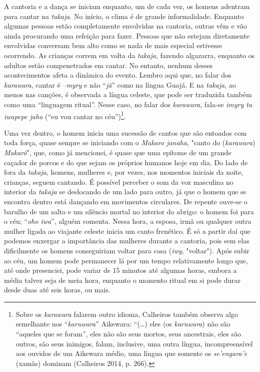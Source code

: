 A cantoria e a dança se iniciam enquanto, um de cada vez, os homens
adentram para cantar na \emph{takaja}. No início, o clima é de grande
informalidade. Enquanto algumas pessoas estão completamente envolvidas
na cantoria, outras vêm e vão ainda procurando uma refeição para fazer.
Pessoas que não estejam diretamente envolvidas conversam bem alto como
se nada de mais especial estivesse ocorrendo. As crianças correm em
volta da \emph{takaja}, fazendo algazarra, enquanto os adultos estão
compenetrados em cantar. No entanto, nenhum desses acontecimentos afeta
a dinâmica do evento. Lembro aqui que, no falar dos \emph{karawara},
cantar é --\emph{myry} e não ``\emph{jã}'' como na língua Guajá. E na
\emph{takaja}, ao menos nas canções, é observada a língua celeste, que
pode ser traduzida também como uma ``linguagem ritual''. Nesse caso, no
falar dos \emph{karawara}, fala-se \emph{imyry ta iwapepe jaha} (``eu
vou cantar no céu'')\footnote{Sobre os \emph{karawara} falarem outro
  idioma, Calheiros também observa algo semelhante nos
  ``\emph{karuwara}'' Aikewara: ``(\ldots{}) eles (os \emph{karuwara}) não
  são ``aqueles que se foram'', eles não são seus mortos, seus
  ancestrais, eles são outros, são seus inimigos, falam, inclusive, uma
  outra língua, incompreensível aos ouvidos de um Aikewara médio, uma
  língua que somente os \emph{se'engara'e} (xamãs) dominam (Calheiros
  2014, p. 266).}.

Uma vez dentro, o homem inicia uma sucessão de cantos que são entoados
com toda força, quase sempre se iniciando com o \emph{Makaro janaha},
"canto do (\emph{karawara}) \emph{Makaró}", que, como já mencionei, é
quase que uma epítome de um grande caçador de porcos e do que sejam os
próprios humanos hoje em dia. Do lado de fora da \emph{takaja}, homens,
mulheres e, por vezes, nos momentos iniciais da noite, crianças, seguem
cantando. É possível perceber o som da voz masculina no interior da
\emph{takaja} se deslocando de um lado para outro, já que o homem que se
encontra dentro está dançando em movimentos circulares. De repente
ouve-se o barulho de um salto e um silêncio mortal no interior do
abrigo: o homem foi para o céu; ``\emph{oho iwa}'', alguém comenta.
Nessa hora, a esposa, irmã ou qualquer outra mulher ligada ao viajante
celeste inicia um canto frenético. É só a partir daí que podemos
enxergar a importância das mulheres durante a cantoria, pois sem elas
dificilmente os homens conseguiriam voltar para casa (\emph{iwy},
"voltar"). Após subir ao céu, um homem pode permanecer lá por um tempo
relativamente longo que, até onde presenciei, pode variar de 15 minutos
até algumas horas, embora a média talvez seja de meia hora, enquanto o
momento ritual em si pode durar desde duas até seis horas, ou mais.


